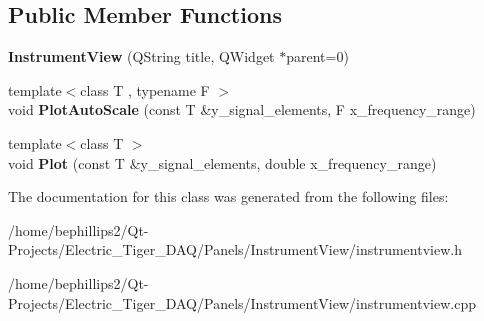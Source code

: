 \subsection*{Public Member Functions}
\begin{DoxyCompactItemize}
\item 
{\bfseries Instrument\+View} (Q\+String title, Q\+Widget $\ast$parent=0)\hypertarget{class_instrument_view_ad5895e0a5192e456d2fc4d33c72c5c8c}{}\label{class_instrument_view_ad5895e0a5192e456d2fc4d33c72c5c8c}

\item 
{\footnotesize template$<$class T , typename F $>$ }\\void {\bfseries Plot\+Auto\+Scale} (const T \&y\+\_\+signal\+\_\+elements, F x\+\_\+frequency\+\_\+range)\hypertarget{class_instrument_view_a8bb3f9c2ccf3dfd8e462efc0bd7535ab}{}\label{class_instrument_view_a8bb3f9c2ccf3dfd8e462efc0bd7535ab}

\item 
{\footnotesize template$<$class T $>$ }\\void {\bfseries Plot} (const T \&y\+\_\+signal\+\_\+elements, double x\+\_\+frequency\+\_\+range)\hypertarget{class_instrument_view_a9cbc2653dc03c2913ef967052d6e16bd}{}\label{class_instrument_view_a9cbc2653dc03c2913ef967052d6e16bd}

\end{DoxyCompactItemize}


The documentation for this class was generated from the following files\+:\begin{DoxyCompactItemize}
\item 
/home/bephillips2/\+Qt-\/\+Projects/\+Electric\+\_\+\+Tiger\+\_\+\+D\+A\+Q/\+Panels/\+Instrument\+View/instrumentview.\+h\item 
/home/bephillips2/\+Qt-\/\+Projects/\+Electric\+\_\+\+Tiger\+\_\+\+D\+A\+Q/\+Panels/\+Instrument\+View/instrumentview.\+cpp\end{DoxyCompactItemize}
